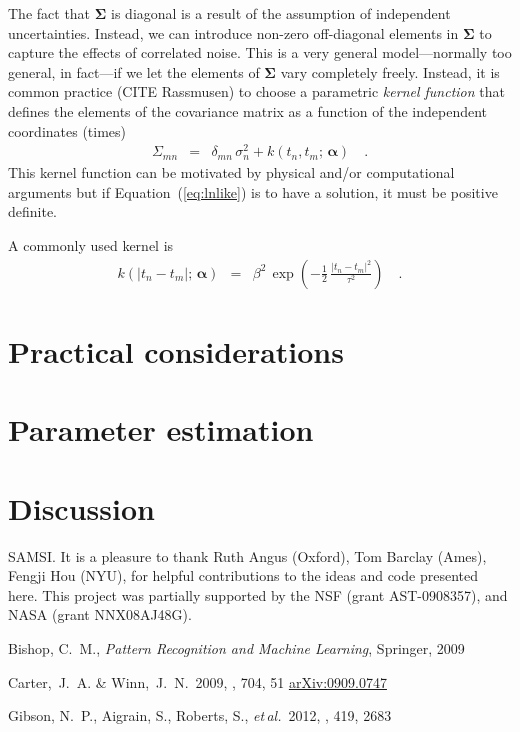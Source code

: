 \documentclass[12pt,preprint]{aastex}
\newcommand{\foreign}[1]{\emph{#1}}
\newcommand{\etal}{\foreign{et\,al.}}
\newcommand{\Eq}[1]{Equation~(\ref{eq:#1})}
\newcommand{\eq}[1]{\Eq{#1}}
\newcommand{\sectlabel}[1]{\label{sect:#1}}
\newcommand{\bvec}[1]{{\ensuremath{\boldsymbol{#1}}}}
\begin{document}
The fact that $\bvec{\Sigma}$ is diagonal is a result of the assumption of
independent uncertainties.
Instead, we can introduce non-zero off-diagonal elements in $\bvec{\Sigma}$ to
capture the effects of correlated noise.
This is a very general model---normally too general, in fact---if we let the
elements of $\bvec{\Sigma}$ vary completely freely.
Instead, it is common practice (CITE Rassmusen) to choose a parametric
\emph{kernel function} that defines the elements of the covariance matrix as a
function of the independent coordinates (times)
\begin{eqnarray}
\Sigma_{mn} &=& \delta_{mn}\,\sigma_n^2 + k(t_n,t_m;\,\bvec{\alpha})\quad.
\end{eqnarray}
This kernel function can be motivated by physical and/or computational
arguments but if \eq{lnlike} is to have a solution, it must be positive
definite.

A commonly used kernel is
\begin{eqnarray}
k(|t_n-t_m|;\,\bvec{\alpha}) &=&
\beta^2 \, \exp \left ( -\frac{1}{2}\,\frac{|t_n-t_m|^2}{\tau^2} \right )
\quad.
\end{eqnarray}

\section{Practical considerations}\sectlabel{practical}

\section{Parameter estimation}\sectlabel{parameters}

\section{Discussion}\sectlabel{discussion}

\acknowledgments
SAMSI. %
It is a pleasure to thank
    Ruth Angus (Oxford),
    Tom Barclay (Ames),
    Fengji Hou (NYU),
for helpful contributions to the ideas and code presented here.
This project was partially supported by the NSF (grant AST-0908357), and NASA
(grant NNX08AJ48G).

\newcommand{\arxiv}[1]{\href{http://arxiv.org/abs/#1}{arXiv:#1}}
\begin{thebibliography}{}\raggedright

Bishop, C.~M., \emph{Pattern Recognition and Machine Learning}, Springer, 2009

Carter,~J.~A. \& Winn,~J.~N.\ 2009, \apj, 704, 51
\arxiv{0909.0747}

\bibitem[Gibson \etal(2012)]{gibson-gp}
Gibson, N.~P., Aigrain, S., Roberts, S., \etal\ 2012, \mnras, 419, 2683

\end{thebibliography}
\end{document}
